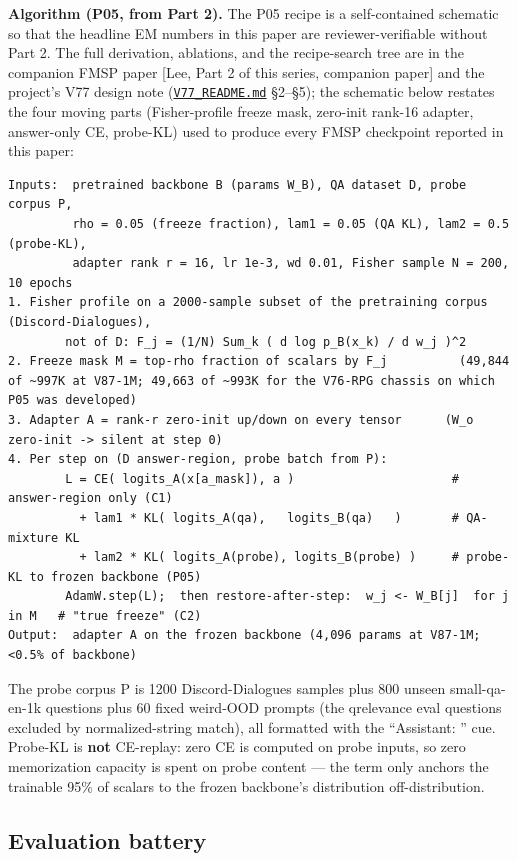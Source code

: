 \documentclass[11pt]{article}
\begin{document}
\textbf{Algorithm (P05, from Part 2).} The P05 recipe is a self-contained schematic so that the headline EM numbers in this paper are reviewer-verifiable without Part 2. The full derivation, ablations, and the recipe-search tree are in the companion FMSP paper [Lee, Part 2 of this series, companion paper] and the project's V77 design note (\href{https://github.com/llaa33219/MicroMixer-4/blob/4bb630413dfa58ef3141291e121ab8c006d03235/V77_README.md}{\texttt{V77\_README.md}} \S2--\S5); the schematic below restates the four moving parts (Fisher-profile freeze mask, zero-init rank-16 adapter, answer-only CE, probe-KL) used to produce every FMSP checkpoint reported in this paper:

\begin{lstlisting}
Inputs:  pretrained backbone B (params W_B), QA dataset D, probe corpus P,
         rho = 0.05 (freeze fraction), lam1 = 0.05 (QA KL), lam2 = 0.5 (probe-KL),
         adapter rank r = 16, lr 1e-3, wd 0.01, Fisher sample N = 200, 10 epochs
1. Fisher profile on a 2000-sample subset of the pretraining corpus (Discord-Dialogues),
        not of D: F_j = (1/N) Sum_k ( d log p_B(x_k) / d w_j )^2
2. Freeze mask M = top-rho fraction of scalars by F_j          (49,844 of ~997K at V87-1M; 49,663 of ~993K for the V76-RPG chassis on which P05 was developed)
3. Adapter A = rank-r zero-init up/down on every tensor      (W_o zero-init -> silent at step 0)
4. Per step on (D answer-region, probe batch from P):
        L = CE( logits_A(x[a_mask]), a )                      # answer-region only (C1)
          + lam1 * KL( logits_A(qa),   logits_B(qa)   )       # QA-mixture KL
          + lam2 * KL( logits_A(probe), logits_B(probe) )     # probe-KL to frozen backbone (P05)
        AdamW.step(L);  then restore-after-step:  w_j <- W_B[j]  for j in M   # "true freeze" (C2)
Output:  adapter A on the frozen backbone (4,096 params at V87-1M; <0.5% of backbone)
\end{lstlisting}

The probe corpus P is 1200 Discord-Dialogues samples plus 800 unseen small-qa-en-1k questions plus 60 fixed weird-OOD prompts (the qrelevance eval questions excluded by normalized-string match), all formatted with the ``Assistant: '' cue. Probe-KL is \textbf{not} CE-replay: zero CE is computed on probe inputs, so zero memorization capacity is spent on probe content --- the term only anchors the trainable 95\% of scalars to the frozen backbone's distribution off-distribution.

\subsection{Evaluation battery}
\end{document}
